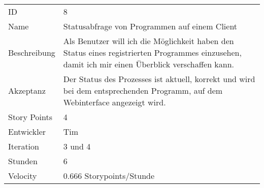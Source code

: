 \begin{table}[htbp]
\begin{minipage}{\linewidth}
\setlength{\tymax}{0.5\linewidth}
\centering
\small
\begin{tabulary}{\textwidth}{|l| p{10cm}|} \toprule
 ID   &8\\


Name  &Statusabfrage von Programmen auf einem Client\\
Beschreibung&Als Benutzer will ich die Möglichkeit haben den Status eines registrierten Programmes einzusehen, damit ich mir einen Überblick verschaffen kann.\\
Akzeptanz &Der Status des Prozesses ist aktuell, korrekt und wird bei dem entsprechenden Programm, auf dem Webinterface angezeigt wird.\\
Story Points&4\\
Entwickler &Tim\\
Iteration &3 und 4\\
Stunden  &6\\
Velocity &0.666 Storypoints\slash Stunde\\
\bottomrule

\end{tabulary}
\end{minipage}
\end{table}



